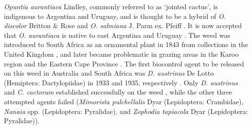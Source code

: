 \textit{Opuntia aurantiaca} Lindley, commonly referred to as `jointed cactus', is indigenous to Argentina and Uruguay, and is thought to be a hybrid of \textit{O. discolor} Britton \& Rose and \textit{O. salmiana} J. Parm ex. Pfeiff \citep{Moran1991BiologicalAfrica}. 
It is now accepted that \textit{O. aurantiaca} is native to east Argentina and Uruguay \citep{DeLotto1974, gunn1979, zimmermann1981JointedCactus}.
The weed was introduced to South Africa as an ornamental plant in 1843 from collections in the United Kingdom \citep{zimmermann1981JointedCactus}, and later became problematic in grazing areas in the Karoo region and the Eastern Cape Province \citep{Moran1991BiologicalAfrica}.
The first biocontrol agent to be released on this weed in Australia and South Africa was \textit{D. austrinus} De Lotto (Hemiptera: Dactylopiidae) in 1933 and 1935, respectively \citep{Moran1991BiologicalAfrica, Winston2014BiologicalWeeds.}. Only \textit{D. austrinus} and \textit{C. cactorum} established successfully on the weed \citep{Klein2011}, while the other three attempted agents failed (\textit{Mimorista pulchellalis} Dyar (Lepidoptera: Crambidae), \textit{Nanaia} spp. (Lepidoptera: Pyralidae), and \textit{Zophodia tapiacola} Dyar (Lepidoptera: Pyralidae)). 

